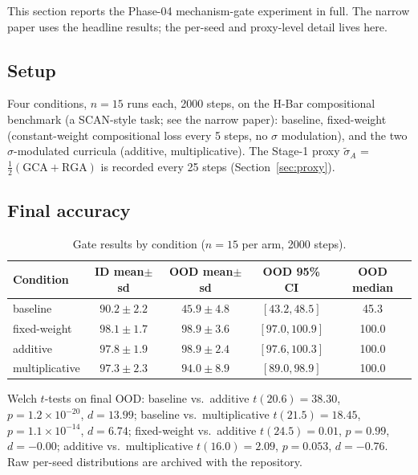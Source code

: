 \documentclass[11pt]{article}
\theoremstyle{definition}
\theoremstyle{plain}
\begin{document}
This section reports the Phase-04 mechanism-gate experiment in full. The
narrow paper uses the headline results; the per-seed and proxy-level
detail lives here.

\subsection{Setup}

Four conditions, $n = 15$ runs each, 2000 steps, on the H-Bar
compositional benchmark (a SCAN-style task; see the narrow paper):
baseline, fixed-weight (constant-weight compositional loss every 5
steps, no $\sigma$ modulation), and the two $\sigma$-modulated curricula
(additive, multiplicative). The Stage-1 proxy $\tilde{\sigma}_A$ =
$\frac{1}{2}(\text{GCA} + \text{RGA})$ is recorded every 25 steps
(Section~\ref{sec:proxy}).

\subsection{Final accuracy}

\begin{table}[htbp]
\centering
\small
\caption{Gate results by condition ($n = 15$ per arm, 2000
steps).}\label{tab:gate-results-companion}
\begin{tabular}{l c c c c}
\toprule
\textbf{Condition} & \textbf{ID mean$\pm$sd} & \textbf{OOD mean$\pm$sd} & \textbf{OOD 95\% CI} & \textbf{OOD median} \\
\midrule
baseline & $90.2 \pm 2.2$ & $45.9 \pm 4.8$ & $[43.2, 48.5]$ & 45.3 \\
fixed-weight & $98.1 \pm 1.7$ & $98.9 \pm 3.6$ & $[97.0, 100.9]$ & 100.0 \\
additive & $97.8 \pm 1.9$ & $98.9 \pm 2.4$ & $[97.6, 100.3]$ & 100.0 \\
multiplicative & $97.3 \pm 2.3$ & $94.0 \pm 8.9$ & $[89.0, 98.9]$ & 100.0 \\
\bottomrule
\end{tabular}
\end{table}

Welch $t$-tests on final OOD: baseline vs.\ additive $t(20.6) = 38.30$,
$p = 1.2\times10^{-20}$, $d = 13.99$; baseline vs.\ multiplicative
$t(21.5) = 18.45$, $p = 1.1\times10^{-14}$, $d = 6.74$; fixed-weight vs.\
additive $t(24.5) = 0.01$, $p = 0.99$, $d = -0.00$; additive vs.\
multiplicative $t(16.0) = 2.09$, $p = 0.053$, $d = -0.76$. Raw per-seed
distributions are archived with the repository.
\end{document}
